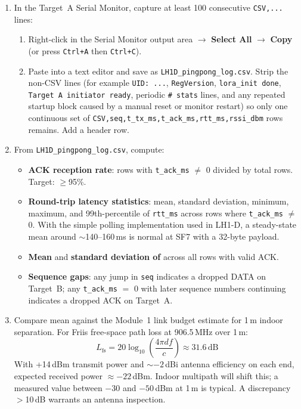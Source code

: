 \documentclass[11pt,letterpaper]{article}
\begin{document}
\newpage
\begin{enumerate}[leftmargin=2em]
	\item In the Target~A Serial Monitor, capture at least 100 consecutive \texttt{CSV,...} lines:
	\begin{enumerate}[leftmargin=1.5em]
		\item Right-click in the Serial Monitor output area $\to$ \textbf{Select All} $\to$ \textbf{Copy} (or press \texttt{Ctrl+A} then \texttt{Ctrl+C}).
        \item Paste into a text editor and save as \texttt{LH1D\_pingpong\_log.csv}. Strip the non-CSV lines (for example \texttt{UID: ...}, \texttt{RegVersion}, \texttt{lora\_init done}, \texttt{Target A initiator ready}, periodic \texttt{\# stats} lines, and any repeated startup block caused by a manual reset or monitor restart) so only one continuous set of \texttt{CSV,seq,t\_tx\_ms,t\_ack\_ms,rtt\_ms,rssi\_dbm} rows remains. Add a header row.
	\end{enumerate}
	\item From \texttt{LH1D\_pingpong\_log.csv}, compute:
	\begin{itemize}[leftmargin=1.5em]
		\item \textbf{ACK reception rate}: rows with \texttt{t\_ack\_ms} $\ne$ 0 divided by total rows. Target: $\geq$95\%.
        \item \textbf{Round-trip latency statistics}: mean, standard deviation, minimum, maximum, and 99th-percentile of \texttt{rtt\_ms} across rows where \texttt{t\_ack\_ms} $\ne$ 0. With the simple polling implementation used in LH1-D, a steady-state mean around $\sim$140--160\,ms is normal at SF7 with a 32-byte payload.
		\item \textbf{Mean \RSSI{}} and \textbf{standard deviation of \RSSI{}} across all rows with valid ACK.
		\item \textbf{Sequence gaps}: any jump in \texttt{seq} indicates a dropped DATA on Target~B; any \texttt{t\_ack\_ms} $=$ 0 with later sequence numbers continuing indicates a dropped ACK on Target~A.
	\end{itemize}
	\item Compare mean \RSSI{} against the Module~1 link budget estimate for 1\,m indoor separation. For Friis free-space path loss at 906.5\,MHz over 1\,m:
	\[
		L_{\text{fs}} = 20\log_{10}\!\left(\frac{4\pi d f}{c}\right) \approx 31.6\,\text{dB}
	\]
	With +14\,dBm transmit power and $\sim-2$\,dBi antenna efficiency on each end, expected received power $\approx -22$\,dBm. Indoor multipath will shift this; a measured value between $-30$ and $-50$\,dBm at 1\,m is typical. A discrepancy $>$10\,dB warrants an antenna inspection.
\end{enumerate}
\end{document}
